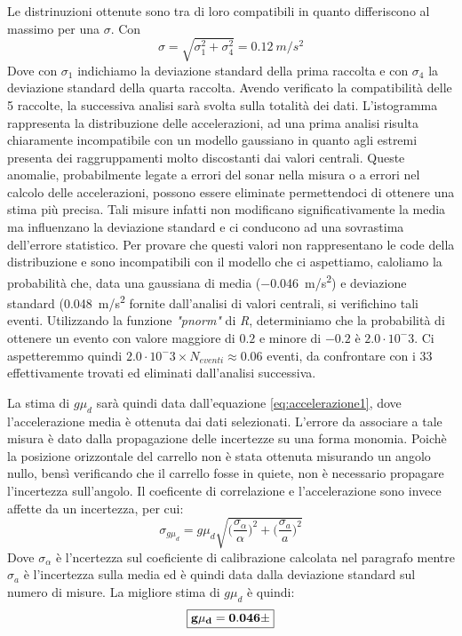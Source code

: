 \documentclass[10pt,oneside,a4paper]{article}
\begin{document}
Le distrinuzioni ottenute sono tra di loro compatibili in quanto differiscono al massimo per una $\sigma$. Con
\begin{equation}\label{eq:duesigma}
\sigma = \sqrt{\sigma_1^2 +\sigma_4^2} = \SI{0.12}{m/s^2}
\end{equation}
Dove con $\sigma_1$ indichiamo la deviazione standard della prima raccolta e con $\sigma_4$ la deviazione standard della quarta raccolta. Avendo verificato la compatibilità delle 5 raccolte, la successiva analisi sarà svolta sulla totalità dei dati. \newline
L'istogramma rappresenta la distribuzione delle accelerazioni, ad una prima analisi risulta chiaramente incompatibile con un modello gaussiano in quanto agli estremi presenta dei raggruppamenti molto discostanti dai valori centrali. Queste anomalie, probabilmente legate a errori del sonar nella misura o a errori nel calcolo delle accelerazioni, possono essere eliminate permettendoci di ottenere una stima più precisa. Tali misure infatti non modificano significativamente la media ma influenzano la deviazione standard e ci conducono ad una sovrastima dell'errore statistico. 
Per provare che questi valori non rappresentano le code della distribuzione e sono incompatibili con il modello che ci aspettiamo, caloliamo la probabilità che, data una gaussiana di media (\SI{-0.046}{m/s^2}) e deviazione standard (\SI{0.048}{m/s^2} fornite dall'analisi di valori centrali, si verifichino tali eventi. Utilizzando la funzione \emph{"pnorm"} di \emph{R}, determiniamo che la probabilità di ottenere un evento con valore maggiore di $0.2$ e minore di $-0.2$ è $2.0\cdot10^-3$. Ci aspetteremmo quindi $2.0\cdot10^-3\times N_{eventi} \approx 0.06$ eventi, da confrontare con i 33 effettivamente trovati ed eliminati dall'analisi successiva.\newline

La stima di $g\mu_d$ sarà quindi data dall'equazione \ref{eq:accelerazione1}, dove l'accelerazione media è ottenuta dai dati selezionati. L'errore da associare a tale misura è dato dalla propagazione delle incertezze su una forma monomia. Poichè la posizione orizzontale del carrello non è stata ottenuta misurando un angolo nullo, bensì verificando che il carrello fosse in quiete, non è necessario propagare l'incertezza sull'angolo. Il coeficente di correlazione e l'accelerazione sono invece affette da un incertezza, per cui:
\begin{equation}\label{eq:incertezzarelativa}
\sigma_{g\mu_d} = g\mu_d\sqrt{\biggl(\frac{\sigma_\alpha}{\alpha}\biggl)^2+\biggl(\frac{\sigma_a}{a}\biggl)^2}
\end{equation}
Dove $\sigma_\alpha$ è l'ncertezza sul coeficiente di calibrazione calcolata nel paragrafo mentre $\sigma_a$ è l'incertezza sulla media ed è quindi data dalla deviazione standard sul numero di misure. 
La migliore stima di $g\mu_d$ è quindi:
\begin{equation}
\boxed{\bf{g\mu_d= 0.046\pm }}
\end{equation}
\end{document}
